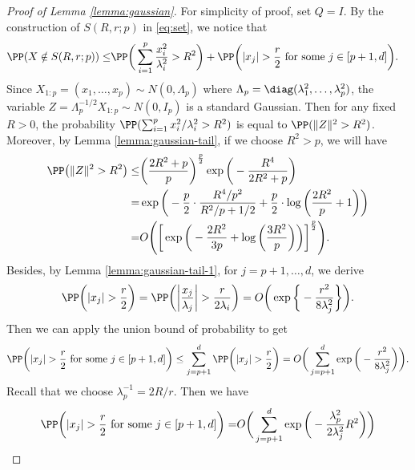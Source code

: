 \begin{proof}[Proof of Lemma \ref{lemma:gaussian}]
    For simplicity of proof, set $Q=I$. By the construction of $S(R,r;p)$ in \eqref{eq:set}, we notice that
    \begin{align*}
        \PP(X \notin S(R,r;p) ) \leq & \PP\bigg(\sum_{i=1}^p \frac{x_i^2}{\lambda_i^2} >  R^2 \bigg) + \PP\bigg(|x_j|>\frac{r}{2} \text{ for some } j \in [p+1,d]\bigg).
    \end{align*}
    Since $X_{1:p}=(x_1,\ldots,x_p)\sim N(0,\Lambda_p)$ where $\Lambda_p=\diag(\lambda_1^2,\ldots,\lambda_p^2)$, the variable $Z=\Lambda_p^{-1/2} X_{1:p} \sim N(0,I_p)$ is a standard Gaussian. Then for any fixed $R>0$, the probability $\PP(\sum_{i=1}^p x_i^2/\lambda_i^2 >  R^2 )
    $ is equal to $ \PP ( \|Z\|^2 > R^2 )$. Moreover, by Lemma \ref{lemma:gaussian-tail}, if we choose $R^2>p$, we will have
    \begin{align*}
         \PP\big( \|Z\|^2 > R^2 \big) \leq&  \bigg( \frac{2R^2 +p}{p} \bigg)^{\frac{p}{2}} \exp \bigg(-\frac{R^4}{2R^2+p} \bigg) \\
         =&  \exp \bigg(-\frac{p}{2} \cdot \frac{R^4/p^2}{R^2/p+1/2} + \frac{p}{2} \cdot \log\bigg( \frac{2R^2}{p}+1 \bigg) \bigg) \\
         =& O \Bigg( \bigg[ \exp \bigg(-\frac{2R^2}{3p} + \log\bigg( \frac{3R^2}{p} \bigg) \bigg) \bigg]^{\frac{p}{2}} \Bigg).
    \end{align*} 
    Besides, by Lemma \ref{lemma:gaussian-tail-1}, for $j=p+1,\ldots,d$, we derive 
    \begin{align*}
        \PP\bigg(|x_j|>\frac{r}{2} \bigg) = \PP\bigg( \bigg| \frac{x_j}{\lambda_j} \bigg|>\frac{r}{2\lambda_i} \bigg) 
        =  O\bigg( \exp\bigg\{ -\frac{r^2}{8\lambda_j^2} \bigg\} \bigg).
    \end{align*}
    Then we can apply the union bound of probability to get
    \begin{align*}
        \PP\bigg(|x_j|> \frac{r}{2} \text{ for some } j \in [p+1,d]\bigg) \leq \sum_{j=p+1}^d  \PP\bigg(|x_j| > \frac{r}{2} \bigg) 
        =  O\bigg( \sum_{j=p+1}^d \exp\bigg( -\frac{r^2}{8\lambda_j^2} \bigg) \bigg).
    \end{align*}
    Recall that we choose $\lambda_p^{-1}=2R/r$. Then we have
    \begin{align*}
        \PP\bigg(|x_j|> \frac{r}{2} \text{ for some } j \in [p+1,d]\bigg) 
        = & O\bigg( \sum_{j=p+1}^d \exp\bigg( -\frac{\lambda_p^2}{2\lambda_j^2} R^2 \bigg) \bigg) \\

\end{align*}
\end{proof}
